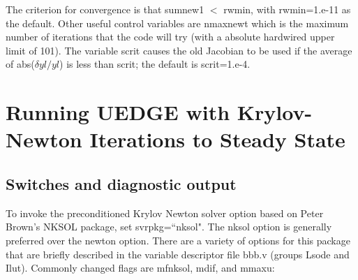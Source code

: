 \documentclass [12pt]{article}
\begin{document}
The criterion for convergence is that sumnew1 $<$ rwmin, with rwmin=1.e-11
as the default.  Other useful control variables are nmaxnewt which is the
maximum number of iterations that the code will try (with a absolute
hardwired upper limit of 101).  The variable scrit causes the old Jacobian
to be used if the average of abs($\delta yl/yl$) is less than {\sf scrit}; the
default is {\sf scrit=1.e-4}.



\section{Running {\sf UEDGE} with Krylov-Newton Iterations to Steady State}

\subsection{Switches and diagnostic output}

To invoke the preconditioned Krylov Newton solver option based on Peter
Brown's {\sf NKSOL} package, set svrpkg=``nksol".  The {\sf nksol} option is
generally preferred over the {\sf newton} option.  There are a variety of
options for this package that are briefly described in the variable descriptor
file bbb.v (groups Lsode and Ilut).  Commonly changed flags are mfnksol, mdif,
and mmaxu:
\end{document}
